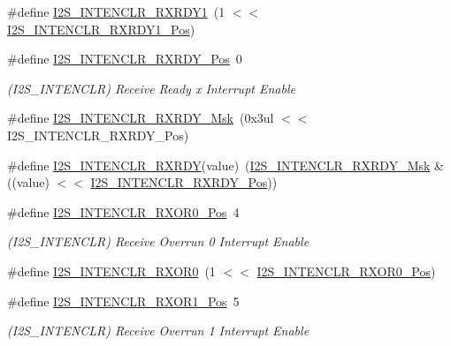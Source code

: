 \begin{DoxyCompactItemize}
\#define \mbox{\hyperlink{group___s_a_m_d21___i2_s_gab56d0e5a4f38d74f7af4ab65cab3f808}{I2\+S\+\_\+\+I\+N\+T\+E\+N\+C\+L\+R\+\_\+\+R\+X\+R\+D\+Y1}}~(1 $<$$<$ \mbox{\hyperlink{group___s_a_m_d21___i2_s_gab9fb50d874f6597bfa69abb73fbf2862}{I2\+S\+\_\+\+I\+N\+T\+E\+N\+C\+L\+R\+\_\+\+R\+X\+R\+D\+Y1\+\_\+\+Pos}})
\item 
\#define \mbox{\hyperlink{group___s_a_m_d21___i2_s_ga04eb812f8b42d1d690ba5420fc6b242b}{I2\+S\+\_\+\+I\+N\+T\+E\+N\+C\+L\+R\+\_\+\+R\+X\+R\+D\+Y\+\_\+\+Pos}}~0
\begin{DoxyCompactList}\small\item\em (I2\+S\+\_\+\+I\+N\+T\+E\+N\+C\+LR) Receive Ready x Interrupt Enable \end{DoxyCompactList}\item 
\#define \mbox{\hyperlink{group___s_a_m_d21___i2_s_gae15f7b5571b4a8ed1c8146b9d67b8032}{I2\+S\+\_\+\+I\+N\+T\+E\+N\+C\+L\+R\+\_\+\+R\+X\+R\+D\+Y\+\_\+\+Msk}}~(0x3ul $<$$<$ I2\+S\+\_\+\+I\+N\+T\+E\+N\+C\+L\+R\+\_\+\+R\+X\+R\+D\+Y\+\_\+\+Pos)
\item 
\#define \mbox{\hyperlink{group___s_a_m_d21___i2_s_gad029e4591f16d6f1866551831160265f}{I2\+S\+\_\+\+I\+N\+T\+E\+N\+C\+L\+R\+\_\+\+R\+X\+R\+DY}}(value)~(\mbox{\hyperlink{group___s_a_m_d21___i2_s_gae15f7b5571b4a8ed1c8146b9d67b8032}{I2\+S\+\_\+\+I\+N\+T\+E\+N\+C\+L\+R\+\_\+\+R\+X\+R\+D\+Y\+\_\+\+Msk}} \& ((value) $<$$<$ \mbox{\hyperlink{group___s_a_m_d21___i2_s_ga04eb812f8b42d1d690ba5420fc6b242b}{I2\+S\+\_\+\+I\+N\+T\+E\+N\+C\+L\+R\+\_\+\+R\+X\+R\+D\+Y\+\_\+\+Pos}}))
\item 
\#define \mbox{\hyperlink{group___s_a_m_d21___i2_s_gae7b60215ac9e256b4660e710f2a20a15}{I2\+S\+\_\+\+I\+N\+T\+E\+N\+C\+L\+R\+\_\+\+R\+X\+O\+R0\+\_\+\+Pos}}~4
\begin{DoxyCompactList}\small\item\em (I2\+S\+\_\+\+I\+N\+T\+E\+N\+C\+LR) Receive Overrun 0 Interrupt Enable \end{DoxyCompactList}\item 
\#define \mbox{\hyperlink{group___s_a_m_d21___i2_s_ga9b6632183c5bcca6570c0c30f457d42f}{I2\+S\+\_\+\+I\+N\+T\+E\+N\+C\+L\+R\+\_\+\+R\+X\+O\+R0}}~(1 $<$$<$ \mbox{\hyperlink{group___s_a_m_d21___i2_s_gae7b60215ac9e256b4660e710f2a20a15}{I2\+S\+\_\+\+I\+N\+T\+E\+N\+C\+L\+R\+\_\+\+R\+X\+O\+R0\+\_\+\+Pos}})
\item 
\#define \mbox{\hyperlink{group___s_a_m_d21___i2_s_ga3ac2f9b1f31d415d4e071d8af0074b06}{I2\+S\+\_\+\+I\+N\+T\+E\+N\+C\+L\+R\+\_\+\+R\+X\+O\+R1\+\_\+\+Pos}}~5
\begin{DoxyCompactList}\small\item\em (I2\+S\+\_\+\+I\+N\+T\+E\+N\+C\+LR) Receive Overrun 1 Interrupt Enable \end{DoxyCompactList}\item 

\end{DoxyCompactItemize}
